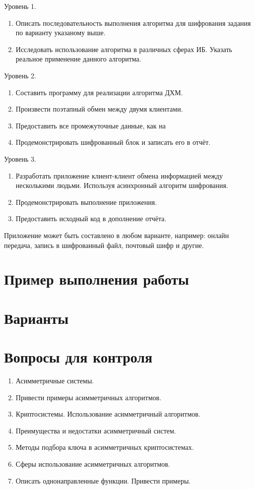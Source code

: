 \noindent Уровень 1.

\begin{enumerate}
    \item Описать последовательность выполнения алгоритма для шифрования
        задания по варианту указаному выше.
  \item Исследовать использование алгоритма в различных сферах ИБ. Указать
      реальное применение данного алгоритма.
\end{enumerate}

\noindent Уровень 2.

\begin{enumerate}
  \item Составить программу для реализации алгоритма ДХМ.
  \item Произвести поэтапный обмен между двумя клиентами.
  \item Предоставить все промежуточные данные, как на 
  \item Продемонстрировать шифрованный блок и записать его в отчёт.
\end{enumerate}

\noindent Уровень 3.

\begin{enumerate}
  \item Разработать приложение клиент-клиент обмена информацией между
      несколькими людьми. Используя асинхронный алгоритм шифрования.
  \item Продемонстрировать выполнение приложения.
  \item Предоставить исходный код в дополнение отчёта.
\end{enumerate}
Приложение может быть составлено в любом варианте, например: онлайн передача,
запись в шифрованный файл, почтовый шифр и другие.
\section{Пример выполнения работы}\label{sect2_c}
%
\section{Варианты}\label{sect2_d}
%
\section{Вопросы для контроля}\label{sect2_e}
\begin{enumerate}
  \item Асимметричные системы.
  \item Привести примеры асимметричных алгоритмов.
  \item Криптосистемы. Использование асимметричный алгоритмов.
  \item Преимущества и недостатки асимметричный систем.
  \item Методы подбора ключа в асимметричных криптосистемах.
  \item Сферы использование асимметричных алгоритмов.
  \item Описать однонаправленные функции. Привести примеры.
\end{enumerate}
%
